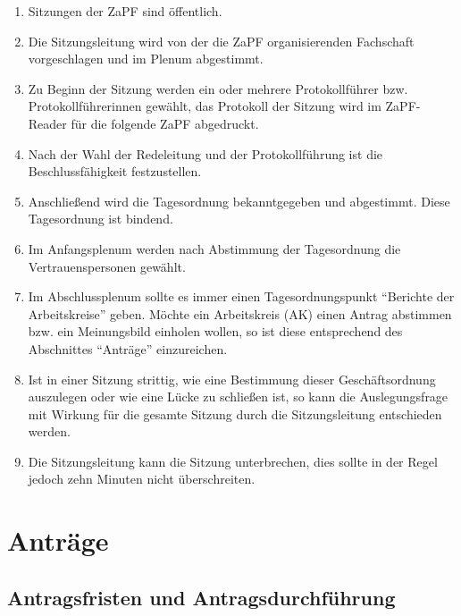 \documentclass[draft,12pt,oneside]{scrreprt}
\begin{document}
\begin{enumerate}
  \item Sitzungen der ZaPF sind öffentlich.

  \item Die Sitzungsleitung wird von der die ZaPF organisierenden Fachschaft
        vorgeschlagen und im Plenum abgestimmt.

  \item Zu Beginn der Sitzung werden ein oder mehrere Protokollführer bzw.
        Protokollführerinnen gewählt, das Protokoll der Sitzung wird im
        ZaPF-Reader für die folgende ZaPF abgedruckt.

  \item Nach der Wahl der Redeleitung und der Protokollführung ist die
        Beschlussfähigkeit festzustellen.

  \item Anschließend wird die Tagesordnung bekanntgegeben und abgestimmt.
        Diese Tagesordnung ist bindend.

  \item Im Anfangsplenum werden nach Abstimmung der Tagesordnung die
        Vertrauenspersonen gewählt.

  \item Im Abschlussplenum sollte es immer einen Tagesordnungspunkt ``Berichte
        der Arbeitskreise'' geben.
        Möchte ein Arbeitskreis (AK) einen Antrag abstimmen bzw. ein Meinungsbild
        einholen wollen, so ist diese entsprechend des Abschnittes ``Anträge''
        einzureichen.

  \item Ist in einer Sitzung strittig, wie eine Bestimmung dieser Geschäftsordnung
        auszulegen oder wie eine Lücke zu schließen ist, so kann die Auslegungsfrage
        mit Wirkung für die gesamte Sitzung durch die Sitzungsleitung entschieden
        werden.

  \item Die Sitzungsleitung kann die Sitzung unterbrechen, dies sollte in der
        Regel jedoch zehn Minuten nicht überschreiten.
\end{enumerate}

\section{Anträge}

\subsection{Antragsfristen und Antragsdurchführung}
\end{document}
